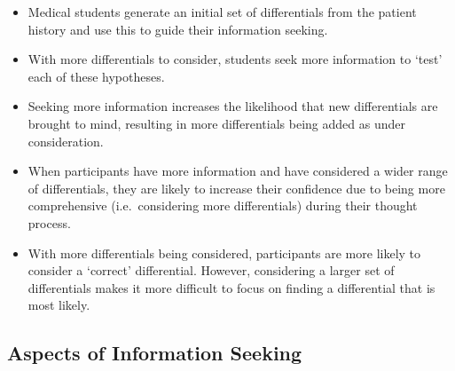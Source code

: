 \documentclass[a4paper, nobind]{templates/ociamthesis}
\providecommand{\tightlist}{%
  \setlength{\itemsep}{0pt}\setlength{\parskip}{0pt}}
\begin{document}
\begin{itemize}
\tightlist
\item
  Medical students generate an initial set of differentials from the patient history and use this to guide their information seeking.
\item
  With more differentials to consider, students seek more information to `test' each of these hypotheses.
\item
  Seeking more information increases the likelihood that new differentials are brought to mind, resulting in more differentials being added as under consideration.
\item
  When participants have more information and have considered a wider range of differentials, they are likely to increase their confidence due to being more comprehensive (i.e.~considering more differentials) during their thought process.
\item
  With more differentials being considered, participants are more likely to consider a `correct' differential. However, considering a larger set of differentials makes it more difficult to focus on finding a differential that is most likely.
\end{itemize}

\subsection*{Aspects of Information Seeking}\label{aspects-of-information-seeking}
\end{document}
